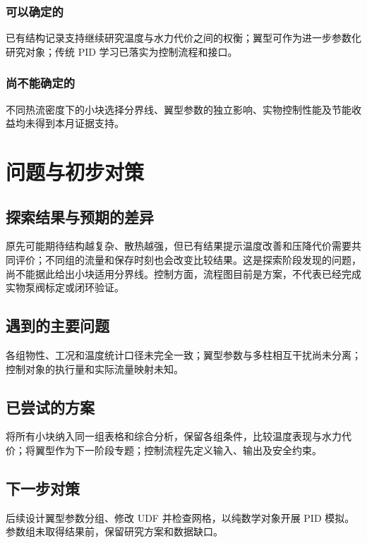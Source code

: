 \documentclass[stage2,fontset=fandol]{ydzjreport}
\begin{document}
\subsubsection{可以确定的}

已有结构记录支持继续研究温度与水力代价之间的权衡；翼型可作为进一步参数化研究对象；传统 PID 学习已落实为控制流程和接口。

\subsubsection{尚不能确定的}

不同热流密度下的小块选择分界线、翼型参数的独立影响、实物控制性能及节能收益均未得到本月证据支持。

\section{问题与初步对策}

\subsection{探索结果与预期的差异}

原先可能期待结构越复杂、散热越强，但已有结果提示温度改善和压降代价需要共同评价；不同组的流量和保存时刻也会改变比较结果。这是探索阶段发现的问题，尚不能据此给出小块适用分界线。控制方面，流程图目前是方案，不代表已经完成实物泵阀标定或闭环验证。



\subsection{遇到的主要问题}

各组物性、工况和温度统计口径未完全一致；翼型参数与多柱相互干扰尚未分离；控制对象的执行量和实际流量映射未知。

\subsection{已尝试的方案}

将所有小块纳入同一组表格和综合分析，保留各组条件，比较温度表现与水力代价；将翼型作为下一阶段专题；控制流程先定义输入、输出及安全约束。

\subsection{下一步对策}

后续设计翼型参数分组、修改 UDF 并检查网格，以纯数学对象开展 PID 模拟。参数组未取得结果前，保留研究方案和数据缺口。
\end{document}
